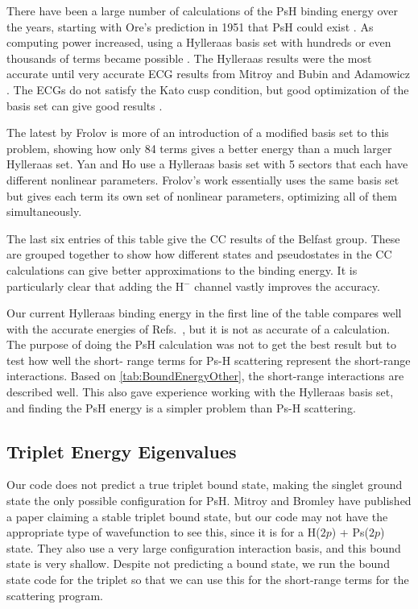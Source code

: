 \documentclass[Dissertation.tex]{subfiles}
\begin{document}
There have been a large number of calculations of the PsH binding energy over 
the years, starting with Ore's prediction in 1951 that PsH could exist
\cite{Ore1951}. As computing power increased, using a Hylleraas basis set with 
hundreds or even thousands of terms became possible
\cite{Ho1978,Ho1986,Yan1999,VanReeth2003}. The Hylleraas results were the most
accurate until very accurate ECG results from Mitroy \cite{Mitroy2006} and Bubin
and Adamowicz \cite{Bubin2004,Bubin2006}. The ECGs do not satisfy the Kato cusp
condition, but good optimization of the basis set can give good results
\cite{Mitroy2013}.

The latest by Frolov \cite{Frolov2010} is more of an introduction of a 
modified basis set to this problem, showing how only 84 terms gives a better 
energy than a much larger Hylleraas set. Yan and Ho \cite{Yan1999} use a 
Hylleraas basis set with 5 sectors that each have different nonlinear 
parameters. Frolov's work essentially uses the same basis set but gives each 
term its own set of nonlinear parameters, optimizing all of them 
simultaneously.

The last six entries of this table give the CC results of the Belfast group. 
These are grouped together to show how different states and pseudostates in 
the CC calculations can give better approximations to the binding energy. It 
is particularly clear that adding the H$^-$ channel vastly improves the 
accuracy.

Our current Hylleraas binding energy in the first line of the table compares
well with the accurate energies of Refs.~\cite{Bubin2006, Mitroy2006, Yan1999},
but it is not as accurate of a calculation. The purpose of doing the PsH 
calculation was not to get the best result but to test how well the short-
range terms for Ps-H scattering represent the short-range interactions. Based 
on \cref{tab:BoundEnergyOther}, the short-range interactions are described 
well. This also gave experience working with the Hylleraas basis set, and 
finding the PsH energy is a simpler problem than Ps-H scattering.

\subsection{Triplet Energy Eigenvalues}
\label{sec:TripletEigenvalues}

Our code does not predict a true triplet bound state, making the singlet 
ground state the only possible configuration for PsH. Mitroy and Bromley have 
published a paper \cite{Mitroy2007} claiming a stable triplet bound state, 
but our code may not have the appropriate type of wavefunction to see this, 
since it is for a H($2p$) + Ps($2p$) state. They also use a very large 
configuration interaction basis, and this bound state is very shallow. 
Despite not predicting a bound state, we run the bound state code for the 
triplet so that we can use this for the short-range terms for the scattering 
program.
\end{document}
